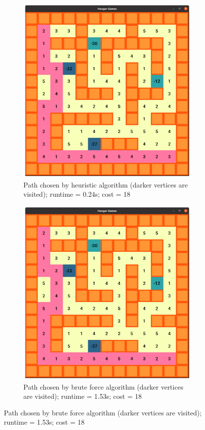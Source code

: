 \documentclass[12pt]{report}
\begin{document}
\begin{figure}[h]
    \begin{subfigure}{0.5\textwidth}
    \centering
    \includegraphics[width=0.9\linewidth]{assets/latex/samePath/hpath.png}
    \caption{Path chosen by heuristic algorithm (darker vertices are visited); runtime = 0.24s; cost = 18}
    \end{subfigure}
    \begin{subfigure}{0.5\textwidth}
    \centering
    \includegraphics[width=0.9\linewidth]{assets/latex/samePath/bpath.png}
    \caption{Path chosen by brute force algorithm (darker vertices are visited); runtime = 1.53s; cost = 18}
    \end{subfigure}
\end{figure}
\end{document}
